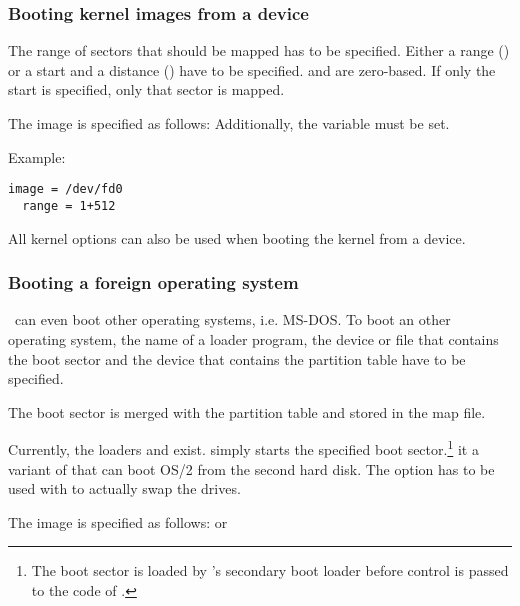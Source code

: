 \subsubsection{Booting kernel images from a device}

The range of sectors
that should be mapped has to be specified. Either a range
() or a start and a distance
() have to be specified. 
and  are zero-based. If only
the start is specified, only that sector is mapped.

The image is specified as follows: \quad
Additionally, the  variable must be set.

Example:
\begin{verbatim}
image = /dev/fd0
  range = 1+512
\end{verbatim}

All kernel options can also be used when booting the kernel from a device.


\subsubsection{Booting a foreign operating system}
\label{bootfor}

\LILO\ can even boot other operating systems, i.e. MS-DOS.
To boot an other operating
system, the name of a loader program, the device or file that contains the boot
sector and the device that contains the partition table have to be
specified.

The boot sector is merged with the partition table and stored in the map file.

Currently, the loaders  and  exist.
 simply starts the specified boot sector.\footnote{The boot
sector is loaded by \LILO's secondary boot loader before control is passed
to the code of .}  it a variant of 
that can boot OS/2 from the second hard disk.
The  option has to be used with  to
actually swap the drives.

The image is specified as follows:  or

